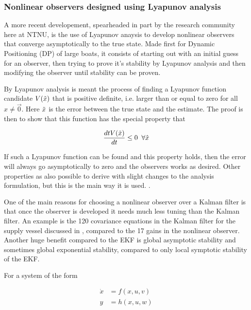 \subsubsection{Nonlinear observers designed using Lyapunov analysis}

A more recent developement, spearheaded in part by the research community here at NTNU, is the use of Lyapunov anaysis to develop nonlinear observers that converge asymptotically to the true state\cite{PassiveFossen}. Made first for Dynamic Positioning (DP) of large boats, it consists of starting out with an initial guess for an observer, then trying to prove it's stability by Lyapunov analysis and then modifying the observer until stability can be proven. 

By Lyapunov analysis\cite{Lyapunov} is meant the process of finding a Lyapunov function candidate $V(\Tilde{x})$ that is positive definite, i.e. larger than or equal to zero for all $x\neq \Vec{0}$. Here $\Tilde{x}$ is the error between the true state and the estimate. The proof is then to show that this function has the special property that

\begin{equation}
    \frac{dt V(\Tilde{x})}{dt} \leq 0 \;\; \forall \hat{x}
\end{equation}

If such a Lyapunov function can be found and this property holds, then the error will always go asymptotically to zero and the observers works as desired. Other properties as also possible to derive with slight changes to the analysis formulation, but this is the main way it is used.  . 

One of the main reasons for choosing a nonlinear observer over a Kalman filter is that once the observer is developed it needs much less tuning than the Kalman filter. An example is the 120 covariance equations in the Kalman filter for the supply vessel discussed in \cite{PassiveFossen}, compared to the 17 gains in the nonlinear observer. Another huge benefit compared to the EKF is global asymptotic stability and sometimes global exponential stability, compared to only local symptotic stability of the EKF. 

For a system of the form 

\begin{align}
    \Dot{x} &= f(x,u,v) \\
    y &= h(x,u,w)
\end{align}


